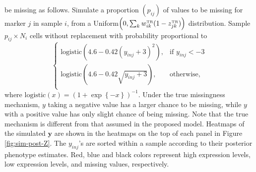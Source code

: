 \documentclass[12pt,]{article}
\newcommand{\p}[1]{\left(#1\right)}
\newcommand{\bc}[1]{ \left\{#1\right\} }
\def\beginmyfig{\begin{figure}[H]\center}
\def\endmyfig{\end{figure}}
\def\y{\bm{y}}
\newcommand{\true}{{\mbox{\tiny TR}}}
\def\beginmyfig{\begin{figure}[H]\center}
\def\endmyfig{\end{figure}}
\begin{document}
be missing as follows. Simulate a proportion $(p_{ij})$ of values to be missing
for marker $j$ in sample $i$, from a
Uniform$\p{0, \sum_k w^\true_{ik}(1-z^\true_{jk})}$ distribution. Sample
$p_{ij}\times N_i$ cells without replacement with probability proportional to
$$
\begin{cases}
  \text{logistic}\p{4.6 - 0.42(y_{inj}+3)^2}, & \text{if } y_{inj} < -3 \\
  \text{logistic}\p{4.6 - 0.42\sqrt{y_{inj}+3}}, & \text{otherwise,} \\
\end{cases}
$$
%
where $\text{logistic}(x) = (1 + \exp\bc{-x})^{-1}$.
Under the true missingness mechanism, $y$ taking a negative value has a larger
chance to be missing, while $y$ with a positive value has only slight chance of
being missing.  Note that the true mechanism is different from that assumed in
the proposed model. Heatmaps of the simulated $\y$ are shown in the heatmaps
on the top of each panel in Figure \ref{fig:sim-post-Z}.
The $y_{inj}$'s are sorted within a sample according to their posterior
phenotype estimates. Red, blue and black colors represent high expression
levels, low expression levels, and missing values, respectively.

\end{document}
